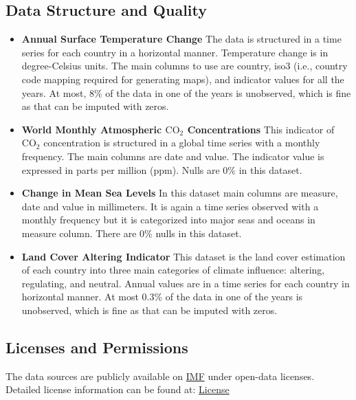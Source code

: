 \documentclass[a4paper,11pt]{article}
\begin{document}
\subsection{Data Structure and Quality}
\begin{itemize}
    \item \textbf{Annual Surface Temperature Change} The data is structured in a time series for each country in a horizontal manner. Temperature change is in degree-Celsius units. The main columns to use are country, iso3 (i.e., country code mapping required for generating maps), and indicator values for all the years. At most, 8\% of the data in one of the years is unobserved, which is fine as that can be imputed with zeros.

    \item \textbf{World Monthly Atmospheric \(\text{CO}_2\) Concentrations} This indicator of \(\text{CO}_2\) concentration is structured in a global time series with a monthly frequency. The main columns are date and value. The indicator value is expressed in parts per million (ppm). Nulls are 0\% in this dataset.

    \item \textbf{Change in Mean Sea Levels} In this dataset main columns are measure, date and value in millimeters. It is again a time series observed with a monthly frequency but it is categorized into major seas and oceans in measure column. There are 0\% nulls in this dataset.

    \item \textbf{Land Cover Altering Indicator} This dataset is the land cover estimation of each country into three main categories of climate influence: altering, regulating, and neutral. Annual values are in a time series for each country in horizontal manner. At most 0.3\% of the data in one of the years is unobserved, which is fine as that can be imputed with zeros.

\end{itemize}

\subsection{Licenses and Permissions}
The data sources are publicly available on \href{https://climatedata.imf.org/}{IMF} under open-data licenses. Detailed license information can be found at:
\href{https://www.imf.org/external/terms.htm}{License}
\end{document}
